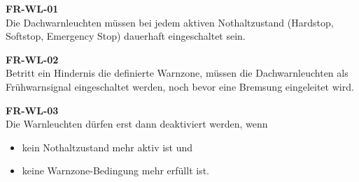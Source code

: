 \textbf{FR-WL-01}\\
Die Dachwarnleuchten müssen bei jedem aktiven Nothaltzustand (\ac{Hardstop}, \ac{Softstop}, Emergency Stop) dauerhaft eingeschaltet sein.

\textbf{FR-WL-02}\\
Betritt ein Hindernis die definierte Warnzone, müssen die Dachwarnleuchten als Frühwarnsignal eingeschaltet werden, noch bevor eine Bremsung eingeleitet wird.

\textbf{FR-WL-03}\\
Die Warnleuchten dürfen erst dann deaktiviert werden, wenn
\begin{itemize}
    \item kein Nothaltzustand mehr aktiv ist und
    \item keine Warnzone-Bedingung mehr erfüllt ist.
\end{itemize}





